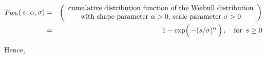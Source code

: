 
\begin{eqnarray*}
F_{\textnormal{Wb}}(\,s\,;\alpha,\sigma)
& = &
	\left(\begin{array}{c}
		\textnormal{cumulative distribution function of the Weibull distribution}
		\\
		\textnormal{with shape parameter $\alpha > 0$, scale parameter $\sigma > 0$}
	\end{array}\right)
\\
& = &
	1 - \exp\!\left(\,-(\overset{{\color{white}1}}{s}/\sigma)^{\alpha}\,\right),
	\quad
	\textnormal{for \,$s \geq 0$}
\end{eqnarray*}


Hence,
